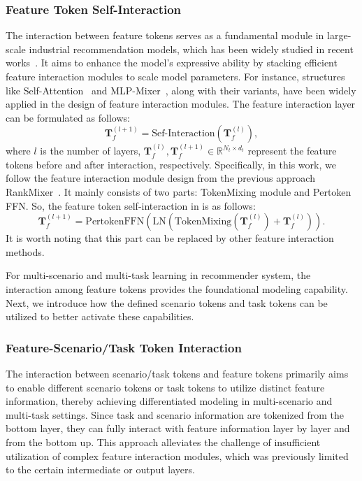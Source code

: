 \subsubsection{Feature Token Self-Interaction}
The interaction between feature tokens serves as a fundamental module in large-scale industrial recommendation models, which has been widely studied in recent works~\cite{OneTrans, RankMixer, hyformer}.
It aims to enhance the model's expressive ability by stacking efficient feature interaction modules to scale model parameters.
For instance, structures like Self-Attention~\cite{transformer} and MLP-Mixer~\cite{MLPMixer}, along with their variants, have been widely applied in the design of feature interaction modules.
The feature interaction layer can be formulated as follows:
\begin{equation}
    \bm{T}_{f}^{(l+1)} = \text{Sef-Interaction}(\bm{T}_{f}^{(l)}),
\end{equation}
where $l$ is the number of layers, $\bm{T}_{f}^{(l)}, \bm{T}_{f}^{(l+1)} \in \mathbb{R}^{N_{t} \times d_{t}}$ represent the feature tokens before and after interaction, respectively.
Specifically, in this work, we follow the feature interaction module design from the previous approach RankMixer~\cite{RankMixer}.
It mainly consists of two parts: TokenMixing module and Pertoken FFN.
So, the feature token self-interaction in \modelname is as follows:
\begin{equation}
\label{eq:feature-interaction}
    \bm{T}_{f}^{(l+1)} = \text{PertokenFFN}(\text{LN}(\text{TokenMixing}(\bm{T}_{f}^{(l)}) + \bm{T}_{f}^{(l)})).
\end{equation}
It is worth noting that this part can be replaced by other feature interaction methods.

For multi-scenario and multi-task learning in recommender system, the interaction among feature tokens provides the foundational modeling capability.
Next, we introduce how the defined scenario tokens and task tokens can be utilized to better activate these capabilities.

\subsubsection{Feature-Scenario/Task Token Interaction}
The interaction between scenario/task tokens and feature tokens primarily aims to enable different scenario tokens or task tokens to utilize distinct feature information, thereby achieving differentiated modeling in multi-scenario and multi-task settings.
Since task and scenario information are tokenized from the bottom layer, they can fully interact with feature information layer by layer and from the bottom up.
This approach alleviates the challenge of insufficient utilization of complex feature interaction modules, which was previously limited to the certain intermediate or output layers.

